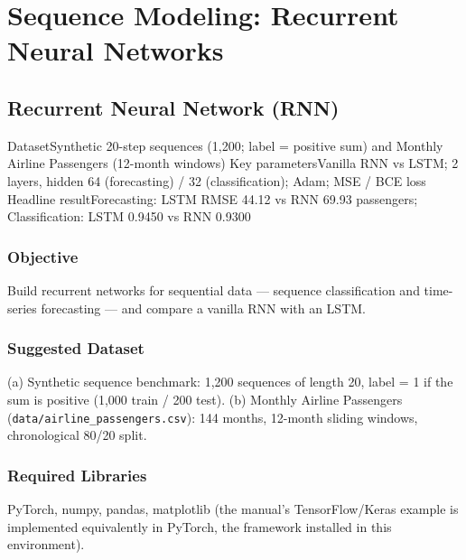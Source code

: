 
\part{Sequence Modeling: Recurrent Neural Networks}

\chapter{Recurrent Neural Network (RNN)}\label{exp:14}


\quickfacts
  {Dataset}{Synthetic 20-step sequences (1,200; label = positive sum) and Monthly Airline Passengers (12-month windows)}
  {Key parameters}{Vanilla RNN vs LSTM; 2 layers, hidden 64 (forecasting) / 32 (classification); Adam; MSE / BCE loss}
  {Headline result}{Forecasting: LSTM RMSE 44.12 vs RNN 69.93 passengers; Classification: LSTM 0.9450 vs RNN 0.9300}

\section{Objective}
Build recurrent networks for sequential data --- sequence classification and time-series
forecasting --- and compare a vanilla RNN with an LSTM.

\section{Suggested Dataset}
(a) Synthetic sequence benchmark: 1,200 sequences of length 20, label = 1 if the sum is
positive (1,000 train / 200 test). (b) Monthly Airline Passengers
(\texttt{data/airline\_passengers.csv}): 144 months, 12-month sliding windows, chronological
80/20 split.

\section{Required Libraries}
PyTorch, numpy, pandas, matplotlib (the manual's TensorFlow/Keras example is implemented
equivalently in PyTorch, the framework installed in this environment).

